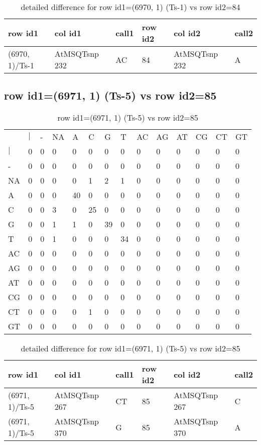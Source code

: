 \begin{center}
\begin{longtable}{|l|l|l|l|l|l|}
\caption{detailed difference for row id1=(6970, 1) (Ts-1) vs row id2=84} \label{table_dm183}\\
\hline
row id1&col id1&call1&row id2&col id2&call2\\
\hline
(6970, 1)/Ts-1&AtMSQTsnp 232&AC&84&AtMSQTsnp 232&A\\
\hline
\end{longtable}
\end{center}

\subsection{row id1=(6971, 1) (Ts-5) vs row id2=85}
\begin{center}
\begin{longtable}{|l|l|l|l|l|l|l|l|l|l|l|l|l|l|}
\caption{row id1=(6971, 1) (Ts-5) vs row id2=85} \label{table_dm184}\\
\hline
\\
\hline
&$|$&-&NA&A&C&G&T&AC&AG&AT&CG&CT&GT\\
$|$&0&0&0&0&0&0&0&0&0&0&0&0&0\\
-&0&0&0&0&0&0&0&0&0&0&0&0&0\\
NA&0&0&0&0&1&2&1&0&0&0&0&0&0\\
A&0&0&0&40&0&0&0&0&0&0&0&0&0\\
C&0&0&3&0&25&0&0&0&0&0&0&0&0\\
G&0&0&1&1&0&39&0&0&0&0&0&0&0\\
T&0&0&1&0&0&0&34&0&0&0&0&0&0\\
AC&0&0&0&0&0&0&0&0&0&0&0&0&0\\
AG&0&0&0&0&0&0&0&0&0&0&0&0&0\\
AT&0&0&0&0&0&0&0&0&0&0&0&0&0\\
CG&0&0&0&0&0&0&0&0&0&0&0&0&0\\
CT&0&0&0&0&1&0&0&0&0&0&0&0&0\\
GT&0&0&0&0&0&0&0&0&0&0&0&0&0\\
\hline
\end{longtable}
\end{center}

\begin{center}
\begin{longtable}{|l|l|l|l|l|l|}
\caption{detailed difference for row id1=(6971, 1) (Ts-5) vs row id2=85} \label{table_dm185}\\
\hline
row id1&col id1&call1&row id2&col id2&call2\\
\hline
(6971, 1)/Ts-5&AtMSQTsnp 267&CT&85&AtMSQTsnp 267&C\\
(6971, 1)/Ts-5&AtMSQTsnp 370&G&85&AtMSQTsnp 370&A\\
\hline
\end{longtable}
\end{center}

